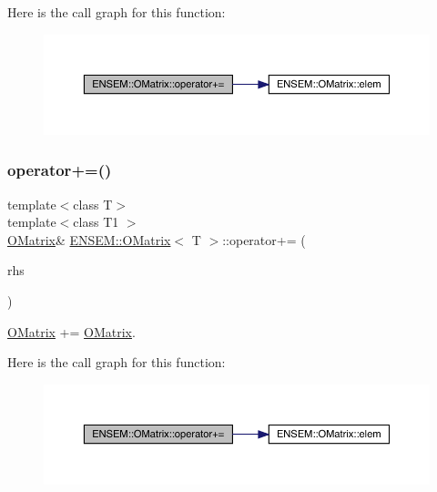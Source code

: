 Here is the call graph for this function\+:
\nopagebreak
\begin{figure}[H]
\begin{center}
\leavevmode
\includegraphics[width=350pt]{dd/d80/classENSEM_1_1OMatrix_a221eb5f9e17402ad93c829fcaf2ac60a_cgraph}
\end{center}
\end{figure}
\mbox{\label{classENSEM_1_1OMatrix_a221eb5f9e17402ad93c829fcaf2ac60a}} 
\subsubsection{\texorpdfstring{operator+=()}{operator+=()}\hspace{0.1cm}{\footnotesize\ttfamily [2/4]}}
{\footnotesize\ttfamily template$<$class T$>$ \\
template$<$class T1 $>$ \\
\mbox{\hyperlink{classENSEM_1_1OMatrix}{O\+Matrix}}\& \mbox{\hyperlink{classENSEM_1_1OMatrix}{E\+N\+S\+E\+M\+::\+O\+Matrix}}$<$ T $>$\+::operator+= (\begin{DoxyParamCaption}\item[{const \mbox{\hyperlink{classENSEM_1_1OMatrix}{O\+Matrix}}$<$ T1 $>$ \&}]{rhs }\end{DoxyParamCaption})\hspace{0.3cm}{\ttfamily [inline]}}



\mbox{\hyperlink{classENSEM_1_1OMatrix}{O\+Matrix}} += \mbox{\hyperlink{classENSEM_1_1OMatrix}{O\+Matrix}}. 

Here is the call graph for this function\+:
\nopagebreak
\begin{figure}[H]
\begin{center}
\leavevmode
\includegraphics[width=350pt]{dd/d80/classENSEM_1_1OMatrix_a221eb5f9e17402ad93c829fcaf2ac60a_cgraph}
\end{center}
\end{figure}
\mbox{\label{classENSEM_1_1OMatrix_ab488697fd72f3891fede3d00f8deb019}} 
